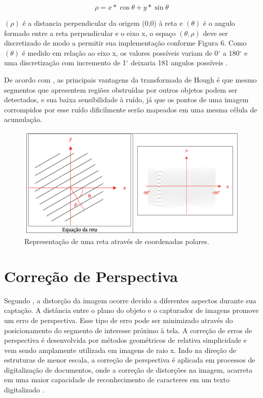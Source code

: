\begin{equation}
\rho = x*\cos{\theta} + y*\sin{\theta}
\label{eq:eqreta}
\end{equation}

$(\rho)$ é a distancia perpendicular da origem (0,0) à reta e $(\theta)$ é o angulo formado entre a reta perpendicular e o eixo x, o espaço $(\theta, \rho)$ deve ser discretizado de modo a permitir sua implementação conforme Figura 6. Como $(\theta)$ é medido em relação ao eixo x, os valores possíveis variam de 0$^{\circ}$ a 180$^{\circ}$ e uma discretização com incremento de 1$^{\circ}$ deixaria 181 angulos possíveis \cite{PEDRINI2008}.

De acordo com , as principais vantagens da transformada de Hough é que mesmo segmentos que apresentem regiões obstruídas por outros objetos podem ser detectados, e sua baixa sensibilidade à ruído, já que os pontos de uma imagem corrompidos por esse ruído dificilmente serão mapeados em uma mesma célula de acumulação.

 \begin{figure}[h]
	\centering
	\includegraphics[width=1.0\textwidth]{Imagens/eqreta} 
	\caption[Representação de uma reta através de coordenadas polares.]{Representação de uma reta através de coordenadas polares.}
	\label{fig:tux_laplace}
\end{figure}


\section{Correção de Perspectiva}

Segundo , a distorção da imagem ocorre devido a diferentes aspectos durante sua captação. A distância entre o plano do objeto e o capturador de imagens promove um erro de perspectiva. Esse tipo de erro pode ser minimizado através do posicionamento do segmento de interesse próximo à tela. A correção de erros de perspectiva é desenvolvida por métodos geométricos de relativa simplicidade e vem sendo amplamente utilizada em imagens de raio x. Indo na direção de estruturas de menor escala, a correção de perspectiva é aplicada em processos de digitalização de documentos, onde a correção de distorções na imagem, acarreta em uma maior capacidade de reconhecimento de caracteres em um texto digitalizado \cite{Pereira}. 

